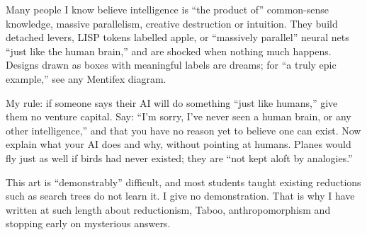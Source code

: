 Many people I know believe intelligence is ``the product of'' common-sense knowledge, massive parallelism, creative destruction or intuition. They build detached levers, LISP tokens labelled apple, or ``massively parallel'' neural nets ``just like the human brain,'' and are shocked when nothing much happens.  Designs drawn as boxes with meaningful labels are dreams; for ``a truly epic example,'' see any Mentifex diagram. 

My rule: if someone says their AI will do something ``just like humans,'' give them no venture capital. Say: ``I'm sorry, I've never seen a human brain, or any other intelligence,'' and that you have no reason yet to believe one can exist. Now explain what your AI does and why, without pointing at humans. Planes would fly just as well if birds had never existed; they are ``not kept aloft by analogies.'' 

This art is ``demonstrably'' difficult, and most students taught existing reductions such as search trees do not learn it. I give no demonstration. That is why I have written at such length about reductionism, Taboo, anthropomorphism and stopping early on mysterious answers.
